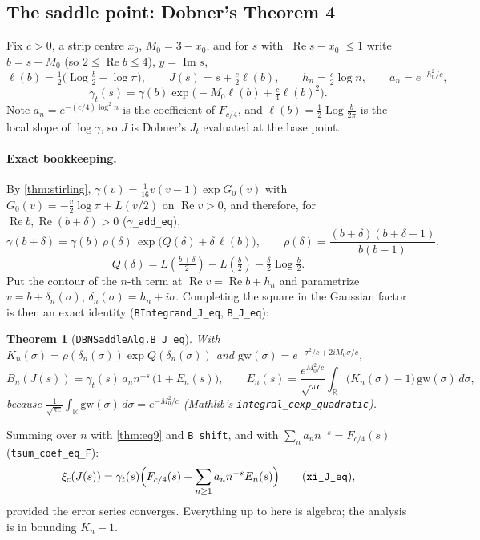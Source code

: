 \documentclass[11pt]{article}
\newtheorem{theorem}{Theorem}
\theoremstyle{definition}
\newcommand{\lean}[1]{\texttt{#1}}
\newcommand{\re}{\operatorname{Re}}
\newcommand{\im}{\operatorname{Im}}
\newcommand{\R}{\mathbb{R}}
\newcommand{\Log}{\operatorname{Log}}
\begin{document}
\subsection{The saddle point: Dobner's Theorem 4}\label{sec:saddle}

Fix $c > 0$, a strip centre $x_0$, $M_0 = 3 - x_0$, and for $s$ with $|\re s - x_0| \le 1$ write $b = s + M_0$ (so $2 \le \re b \le 4$), $y = \im s$,
\[
\ell(b) = \tfrac12\bigl(\Log\tfrac{b}{2} - \log\pi\bigr),\qquad
J(s) = s + \tfrac{c}{2}\ell(b),\qquad
h_n = \tfrac{c}{2}\log n,\qquad a_n = e^{-h_n^2/c},
\]
\[
\gamma_t(s) = \gamma(b)\exp\bigl(-M_0\ell(b) + \tfrac{c}{4}\ell(b)^2\bigr).
\]
Note $a_n = e^{-(c/4)\log^2 n}$ is the coefficient of $F_{c/4}$, and $\ell(b) = \tfrac12\Log\tfrac{b}{2\pi}$ is the local slope of $\log\gamma$, so $J$ is Dobner's $J_t$ evaluated at the base point.

\paragraph{Exact bookkeeping.} By \cref{thm:stirling}, $\gamma(v) = \tfrac1{16}v(v-1)\exp G_0(v)$ with $G_0(v) = -\tfrac{v}{2}\log\pi + L(v/2)$ on $\re v > 0$, and therefore, for $\re b, \re(b+\delta) > 0$ (\lean{$\gamma$\_add\_eq}),
\[
\gamma(b+\delta) = \gamma(b)\,\rho(\delta)\,\exp\bigl(Q(\delta) + \delta\,\ell(b)\bigr),\qquad
\rho(\delta) = \frac{(b+\delta)(b+\delta-1)}{b(b-1)},
\]
\[
Q(\delta) = L\!\left(\tfrac{b+\delta}{2}\right) - L\!\left(\tfrac{b}{2}\right) - \tfrac{\delta}{2}\Log\tfrac{b}{2}.
\]
Put the contour of the $n$-th term at $\re v = \re b + h_n$ and parametrize $v = b + \delta_n(\sigma)$, $\delta_n(\sigma) = h_n + i\sigma$. Completing the square in the Gaussian factor is then an exact identity (\lean{BIntegrand\_J\_eq}, \lean{B\_J\_eq}):

\begin{theorem}[\lean{DBNSaddleAlg.B\_J\_eq}]
With $K_n(\sigma) = \rho(\delta_n(\sigma))\exp Q(\delta_n(\sigma))$ and $\mathrm{gw}(\sigma) = e^{-\sigma^2/c + 2iM_0\sigma/c}$,
\[
B_n(J(s)) = \gamma_t(s)\, a_n n^{-s}\,\bigl(1 + E_n(s)\bigr),\qquad
E_n(s) = \frac{e^{M_0^2/c}}{\sqrt{\pi c}}\int_\R \bigl(K_n(\sigma) - 1\bigr)\,\mathrm{gw}(\sigma)\,d\sigma,
\]
because $\frac{1}{\sqrt{\pi c}}\int_\R \mathrm{gw}(\sigma)\,d\sigma = e^{-M_0^2/c}$ (Mathlib's \lean{integral\_cexp\_quadratic}).
\end{theorem}

Summing over $n$ with \cref{thm:eq9} and \lean{B\_shift}, and with $\sum_n a_n n^{-s} = F_{c/4}(s)$ (\lean{tsum\_coef\_eq\_F}):
\begin{equation}\label{eq:xiJ}
\xi_c(J(s)) = \gamma_t(s)\Bigl(F_{c/4}(s) + \sum_{n\ge1} a_n n^{-s}E_n(s)\Bigr)
\qquad(\lean{xi\_J\_eq}),
\end{equation}
provided the error series converges. Everything up to here is algebra; the analysis is in bounding $K_n - 1$.
\end{document}
